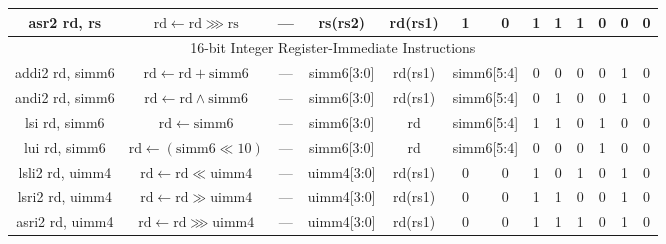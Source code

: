 \documentclass[a4paper,10pt]{article}
\begin{document}
\begin{landscape}
\begin{longtable}[c]{|c|c|@{}c@{}|@{}c@{}|@{}c@{}|@{}c@{}|@{}c@{}|@{}c@{}|@{}c@{}|@{}c@{}|@{}c@{}|@{}c@{}|@{}c@{}|@{}c@{}|@{}c@{}|@{}c@{}|@{}c@{}|@{}c@{}|@{}c@{}|@{}c@{}|@{}c@{}|@{}c@{}|@{}c@{}|@{}c@{}|@{}c@{}|@{}c@{}|}
asr2 rd, rs           & $\mathrm{rd} \leftarrow \mathrm{rd} \ggg \mathrm{rs}$ & \multicolumn{8}{c|}{---}                                   & \multicolumn{4}{c|}{rs(rs2)}        & \multicolumn{4}{c|}{rd(rs1)} & 1                & 0                & 1   & 1   & 1   & 0 & 0 & 0 \\

\hline
\multicolumn{26}{|c|}{16-bit Integer Register-Immediate Instructions}                                                                                                                                                                                                                                                             \\\hline
addi2 rd, simm6       & $\mathrm{rd} \leftarrow \mathrm{rd} + \mathrm{simm6}$ & \multicolumn{8}{c|}{---}                                   & \multicolumn{4}{c|}{simm6{[}3:0{]}} & \multicolumn{4}{c|}{rd(rs1)} & \multicolumn{2}{c|}{simm6{[}5:4{]}}  & 0   & 0   & 0   & 0 & 1 & 0 \\
andi2 rd, simm6       & $\mathrm{rd} \leftarrow \mathrm{rd} \land \mathrm{simm6}$ & \multicolumn{8}{c|}{---}                                   & \multicolumn{4}{c|}{simm6{[}3:0{]}} & \multicolumn{4}{c|}{rd(rs1)} & \multicolumn{2}{c|}{simm6{[}5:4{]}}  & 0   & 1   & 0   & 0 & 1 & 0 \\
lsi rd, simm6         & $\mathrm{rd} \leftarrow \mathrm{simm6}$ & \multicolumn{8}{c|}{---}                                   & \multicolumn{4}{c|}{simm6{[}3:0{]}} & \multicolumn{4}{c|}{rd}      & \multicolumn{2}{c|}{simm6{[}5:4{]}}  & 1   & 1   & 0   & 1 & 0 & 0 \\
lui rd, simm6         & $\mathrm{rd} \leftarrow (\mathrm{simm6} \ll 10)$ & \multicolumn{8}{c|}{---}                                   & \multicolumn{4}{c|}{simm6{[}3:0{]}} & \multicolumn{4}{c|}{rd}      & \multicolumn{2}{c|}{simm6{[}5:4{]}}  & 0   & 0   & 0   & 1 & 0 & 0 \\
lsli2 rd, uimm4       & $\mathrm{rd} \leftarrow \mathrm{rd} \ll \mathrm{uimm4}$ & \multicolumn{8}{c|}{---}                                   & \multicolumn{4}{c|}{uimm4{[}3:0{]}} & \multicolumn{4}{c|}{rd(rs1)} & 0              & 0              & 1   & 0   & 1   & 0 & 1 & 0 \\
lsri2 rd, uimm4       & $\mathrm{rd} \leftarrow \mathrm{rd} \gg \mathrm{uimm4}$ & \multicolumn{8}{c|}{---}                                   & \multicolumn{4}{c|}{uimm4{[}3:0{]}} & \multicolumn{4}{c|}{rd(rs1)} & 0              & 0              & 1   & 1   & 0   & 0 & 1 & 0 \\
asri2 rd, uimm4       & $\mathrm{rd} \leftarrow \mathrm{rd} \ggg \mathrm{uimm4}$ & \multicolumn{8}{c|}{---}                                   & \multicolumn{4}{c|}{uimm4{[}3:0{]}} & \multicolumn{4}{c|}{rd(rs1)} & 0              & 0              & 1   & 1   & 1   & 0 & 1 & 0 \\


\end{longtable}
\end{landscape}
\end{document}
